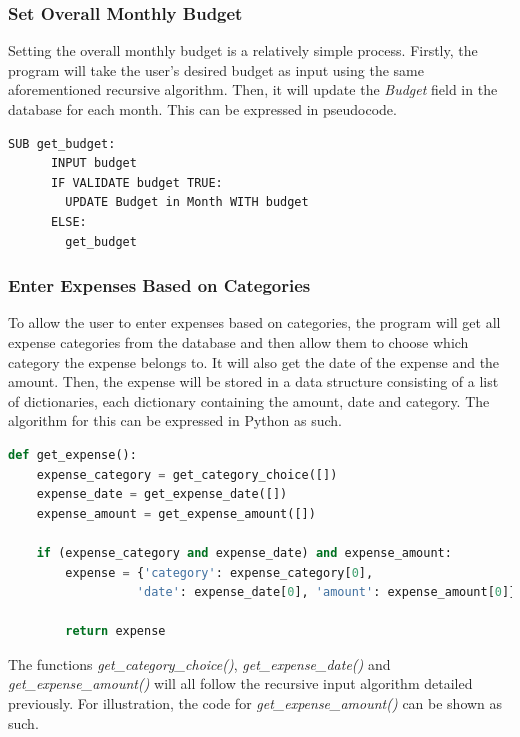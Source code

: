 \documentclass[12pt]{article}
\begin{document}
  \subsubsection{Set Overall Monthly Budget}
  Setting the overall monthly budget is a relatively simple process. Firstly, the program will take the user's desired budget as input using the same aforementioned recursive algorithm. Then, it will update the \textit{Budget} field in the database for each month.
  This can be expressed in pseudocode.
  \begin{lstlisting}[caption=An algorithm to set the overall monthly budget., captionpos=b]
    SUB get_budget:
      INPUT budget
      IF VALIDATE budget TRUE:
        UPDATE Budget in Month WITH budget
      ELSE:
        get_budget
  \end{lstlisting}

  \subsubsection{Enter Expenses Based on Categories}
  To allow the user to enter expenses based on categories, the program will get all expense categories from the database and then allow them to choose which category the expense belongs to. It will also get the date of the expense and the amount. Then, the expense will be stored in a data structure consisting of a list of dictionaries, each dictionary containing the amount, date and category.
  The algorithm for this can be expressed in Python as such.
  \begin{lstlisting}[language=Python, caption=An algorithm to collect expenses from the user., captionpos=b]
  def get_expense():
    expense_category = get_category_choice([])
    expense_date = get_expense_date([])
    expense_amount = get_expense_amount([])

    if (expense_category and expense_date) and expense_amount:
        expense = {'category': expense_category[0],
                  'date': expense_date[0], 'amount': expense_amount[0]}

        return expense
  \end{lstlisting}

  The functions \textit{get\_category\_choice()}, \textit{get\_expense\_date()} and \textit{get\_expense\_amount()} will all follow the recursive input algorithm detailed previously. For illustration, the code for \textit{get\_expense\_amount()} can be shown as such.
\end{document}
